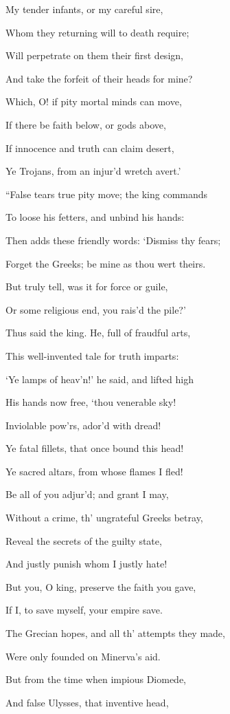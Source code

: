 My tender infants, or my careful sire,

Whom they returning will to death require;

Will perpetrate on them their first design,

And take the forfeit of their heads for mine?

Which, O! if pity mortal minds can move,

If there be faith below, or gods above,

If innocence and truth can claim desert,

Ye Trojans, from an injur’d wretch avert.’

“False tears true pity move; the king commands

To loose his fetters, and unbind his hands:

Then adds these friendly words: ‘Dismiss thy fears;

Forget the Greeks; be mine as thou wert theirs.

But truly tell, was it for force or guile,

Or some religious end, you rais’d the pile?’

Thus said the king. He, full of fraudful arts,

This well-invented tale for truth imparts:

‘Ye lamps of heav’n!’ he said, and lifted high

His hands now free, ‘thou venerable sky!

Inviolable pow’rs, ador’d with dread!

Ye fatal fillets, that once bound this head!

Ye sacred altars, from whose flames I fled!

Be all of you adjur’d; and grant I may,

Without a crime, th’ ungrateful Greeks betray,

Reveal the secrets of the guilty state,

And justly punish whom I justly hate!

But you, O king, preserve the faith you gave,

If I, to save myself, your empire save.

The Grecian hopes, and all th’ attempts they made,

Were only founded on Minerva’s aid.

But from the time when impious Diomede,

And false Ulysses, that inventive head,

